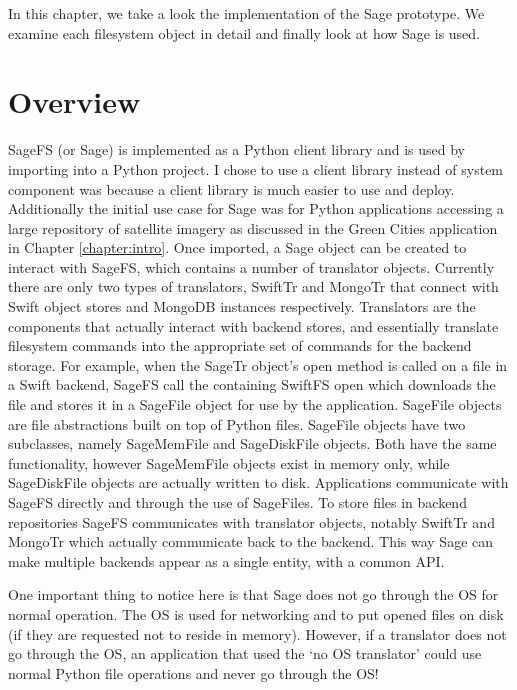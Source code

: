 \label{chapter:imp}

In this chapter, we take a look the implementation of the Sage prototype. We examine each filesystem object in detail and finally look at how Sage is used.

\section{Overview}

SageFS (or Sage) is implemented as a Python client library and is used by importing into a  Python project. I chose to use a client library instead of system component was because a  client library is much easier to use and deploy. Additionally the initial use case for  Sage was for Python applications accessing a large repository of satellite imagery as discussed in the Green  Cities application in Chapter \ref{chapter:intro}.  Once imported, a Sage object can be created to interact with SageFS, which contains a number of translator objects. Currently there are only two types of translators, SwiftTr and MongoTr  that connect with Swift object stores and MongoDB instances respectively. Translators are the components that actually interact with backend stores, and essentially translate filesystem  commands into the appropriate set of commands for the backend storage. For example, when the SageTr object's open method is called on a file in a Swift backend, SageFS call the containing  SwiftFS open which downloads the file and stores it in a SageFile object for use by the application.  SageFile objects are file abstractions built on top of Python files. SageFile objects have two subclasses, namely SageMemFile and SageDiskFile objects. Both have the same functionality, however  SageMemFile objects exist in memory only, while SageDiskFile objects are actually written to disk.  Applications communicate with SageFS directly and through the use of SageFiles. To store files in backend repositories SageFS communicates with translator objects, notably SwiftTr and MongoTr  which actually communicate back to the backend. This way Sage can make multiple backends appear  as a single entity, with a common API. 

One important thing to notice here is that Sage does not go through the OS for
normal operation.  The OS is used for networking and to put opened files on
disk (if they are requested not to  reside in memory). However, if a
translator does not go through the OS, an application that  used the `no OS
translator' could use normal Python file operations and never go through the
OS!


